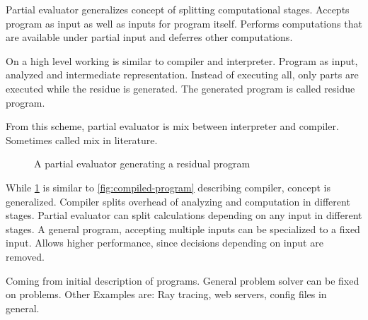 Partial evaluator generalizes concept of splitting computational stages.
Accepts program as input as well as inputs for program itself.
Performs computations that are available under partial input and deferres other computations.

On a high level working is similar to compiler and interpreter.
Program as input, analyzed and intermediate representation.
Instead of executing all, only parts are executed while the residue is generated.
The generated program is called residue program.

From this scheme, partial evaluator is mix between interpreter and compiler.
Sometimes called mix in literature.

\begin{figure}
  \centering
  
  \caption{A partial evaluator generating a residual program}\label{fig:partial-evaluated-program}
\end{figure}

While \ref{fig:partial-evaluated-program} is similar to \ref{fig:compiled-program} describing compiler, concept is generalized.
Compiler splits overhead of analyzing and computation in different stages.
Partial evaluator can split calculations depending on any input in different stages.
A general program, accepting multiple inputs can be specialized to a fixed input.
Allows higher performance, since decisions depending on input are removed.

Coming from initial description of programs.
General problem solver can be fixed on problems.
Other Examples are: Ray tracing, web servers, config files in general.



